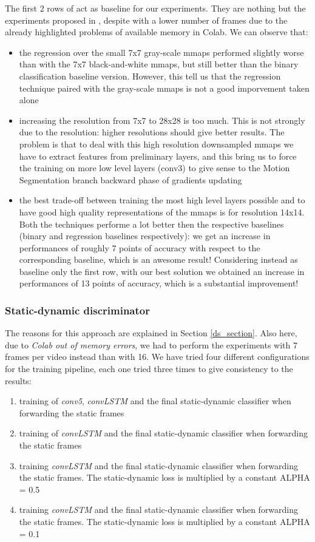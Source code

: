 \documentclass[10pt,twocolumn,hidelinks,letterpaper]{article}
\begin{document}
The first 2 rows of  act as baseline for our experiments. They are nothing but the experiments proposed in \cite{sparnet}, despite with a lower number of frames due to the already highlighted problems of available memory in Colab. We can observe that:
\begin{itemize}
  \item the regression over the small 7x7 gray-scale mmaps performed slightly worse than with the 7x7 black-and-white mmaps, but still better than the binary classification baseline version. However, this tell us that the regression technique paired with the gray-scale mmaps is not a good imporvement taken alone
  \item increasing the resolution from 7x7 to 28x28 is too much. This is not strongly due to the resolution: higher resolutions should give better results. The problem is that to deal with this high resolution downsampled mmaps we have to extract features from preliminary layers, and this bring us to force the training on more low level layers (conv3) to give sense to the Motion Segmentation branch backward phase of gradients updating
  \item the best trade-off between training the most high level layers possible and to have good high quality representations of the mmaps is for resolution 14x14. Both the techniques performe a lot better then the respective baselines (binary and regression baselines respectively): we get an increase in performances of roughly 7 points of accuracy with respect to the corresponding baseline, which is an awesome result! Considering instead as baseline only the first row, with our best solution we obtained an increase in performances of 13 points of accuracy, which is a substantial improvement!
\end{itemize}

\subsubsection{Static-dynamic discriminator}

The reasons for this approach are explained in Section \ref{ds_section}. Also here, due to \textit{Colab out of memory errors}, we had to perform the experiments with 7 frames per video instead than with 16. We have tried four different configurations for the training pipeline, each one tried three times to give consistency to the results:
\begin{enumerate}
  \item training of \textit{conv5}, \textit{convLSTM} and the final static-dynamic classifier when forwarding the static frames
  \item training of \textit{convLSTM} and the final static-dynamic classifier when forwarding the static frames
  \item training \textit{convLSTM} and the final static-dynamic classifier when forwarding the static frames. The static-dynamic loss is multiplied by a constant ALPHA = 0.5
  \item training \textit{convLSTM} and the final static-dynamic classifier when forwarding the static frames. The static-dynamic loss is multiplied by a constant ALPHA = 0.1
\end{enumerate}
\end{document}
